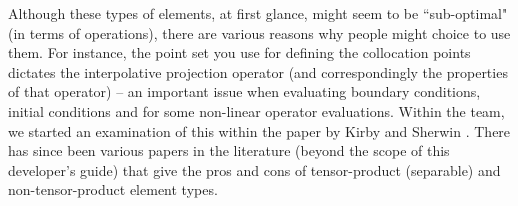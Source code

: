 Although these types of elements, at first glance, might seem to be ``sub-optimal" (in terms of operations), there
are various reasons why people might choice to use them.  For instance, the point set you use for defining 
the collocation points dictates the interpolative projection operator (and correspondingly the properties of that
operator) -- an important issue when evaluating boundary conditions, initial conditions and for some non-linear operator
evaluations.  Within the {\nek} team, we started an examination of this within the paper by 
Kirby and Sherwin \cite{KirbyS06}.  There has since been various papers in the literature (beyond the scope of this
developer's guide) that give the pros and cons of tensor-product (separable) and non-tensor-product element
types.  

